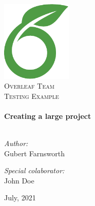 \begin{titlepage}
\vbox{ }

\vbox{ }

\begin{center}
\includegraphics[width=0.25\textwidth]{./sections/img/overleaf-logo}\\[1cm]
\textsc{\LARGE Overleaf Team}\\[1.5cm]
\textsc{\Large Testing Example}\\[0.5cm]

\vbox{ }
\HRule \\[0.4cm]
{ \huge \bfseries Creating a large project}\\[0.4cm]
\HRule \\[1.5cm]
\begin{minipage}{0.4\textwidth}
\begin{flushleft} \large
\emph{Author:}\\
Gubert Farnsworth
\end{flushleft}
\end{minipage}
\begin{minipage}{0.4\textwidth}
\begin{flushright} \large
\emph{Special colaborator:} \\
John Doe
\end{flushright}
\end{minipage}
\vfill
{\large July, 2021}
\end{center}
\end{titlepage}